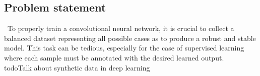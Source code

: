 \subsection{Problem statement}

\
To properly train a convolutional neural network, it is crucial to collect a
balanced dataset representing all possible cases as to produce a robust and
stable model. This task can be tedious, especially for the case of supervised
learning where each sample must be annotated with the desired learned output.\\

todo{Talk about synthetic data in deep learning}
